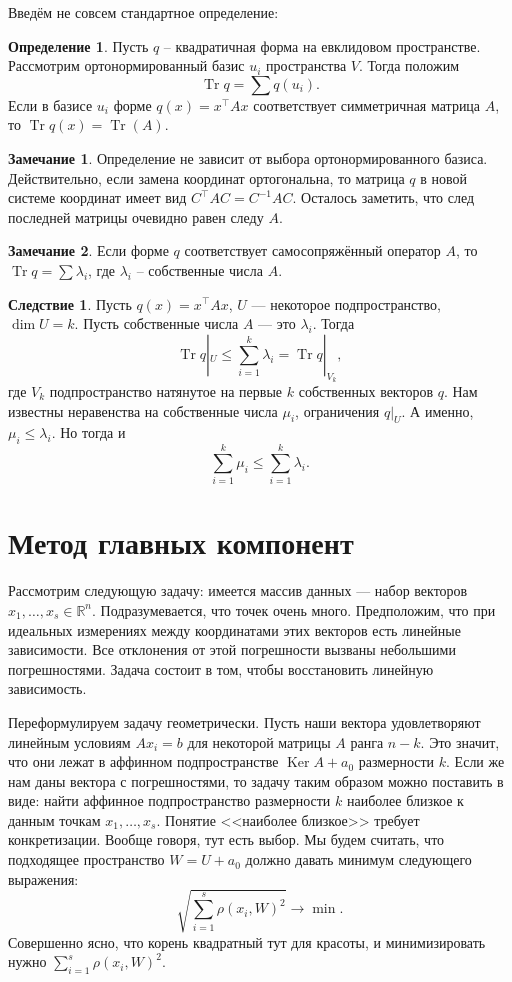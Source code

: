 \documentclass[12pt,a4paper,oneside]{book}
\theoremstyle{definition}
\newtheorem*{rem}{\color{green!50!blue}Замечание}
\newtheorem*{defn}{\color{yellow!30!red} Определение}
\newtheorem{cor}{\color{green!45!black}Следствие}
\renewcommand{\leq}{\leqslant}
\DeclareMathOperator{\Ker}{Ker}
\newcommand{\Tr}{\operatorname{Tr}}
\newcommand{\R}{\mathbb R}
\def\dfn{\begin{defn}}
\def\edfn{\end{defn}}
\def\crl{\begin{cor}}
\def\ecrl{\end{cor}}
\def\rm{\begin{rem}}
\def\erm{\end{rem}}
\begin{document}
Введём не совсем стандартное определение:
\dfn
Пусть $q$ -- квадратичная форма на евклидовом пространстве. Рассмотрим ортонормированный базис $u_i$ пространства $V$. Тогда положим 
$$\Tr q= \sum q(u_i).$$ Если в базисе $u_i$ форме $q(x)=x^{\top} Ax $ соответствует симметричная матрица $A$, то $\Tr q(x)=\Tr(A)$.
\edfn

\rm Определение не зависит от выбора ортонормированного базиса. Действительно, если замена координат ортогональна, то матрица $q$ в новой системе координат имеет вид $C^{\top}AC=C^{-1}AC$. Осталось заметить, что след последней матрицы очевидно равен следу $A$.
\erm

\rm Если форме $q$ соответствует самосопряжённый оператор $A$, то $\Tr q=\sum \lambda_i$, где $\lambda_i$ -- собственные числа $A$.
\erm




\crl Пусть $q(x)=x^{\top} Ax$, $U$ --- некоторое подпространство, $\dim U=k$. Пусть собственные числа $A$ --- это $\lambda_i$. Тогда $$\Tr q|_U\leq \sum_{i=1}^k \lambda_i= \Tr q|_{V_k},$$
где $V_k$ подпространство натянутое на первые $k$ собственных векторов $q$.
\proof Нам известны неравенства на собственные числа $\mu_i$, ограничения $q|_U$. А именно, $\mu_i\leq \lambda_i$. Но тогда и $$\sum_{i=1}^k \mu_i \leq \sum_{i=1}^k \lambda_i.$$
\endproof
\ecrl 






\section{Метод главных компонент}

Рассмотрим следующую задачу: имеется массив данных --- набор векторов $x_1,\dots,x_s \in \R^n$. Подразумевается, что точек очень много. Предположим, что при идеальных измерениях между координатами этих векторов есть линейные зависимости. Все отклонения от этой погрешности вызваны небольшими погрешностями. Задача состоит в том, чтобы восстановить линейную зависимость. 


Переформулируем задачу геометрически. Пусть наши вектора удовлетворяют линейным условиям $Ax_i=b$ для некоторой матрицы $A$ ранга $n-k$. Это значит, что они лежат в аффинном подпространстве $\Ker A + a_0$ размерности $k$. Если же нам даны вектора с погрешностями, то задачу таким образом можно поставить в виде: найти аффинное подпространство размерности $k$ наиболее близкое к данным точкам $x_1,\dots,x_s$. Понятие <<наиболее близкое>> требует конкретизации. Вообще говоря, тут есть выбор. Мы будем считать, что подходящее пространство $W=U+a_0$ должно давать минимум следующего выражения:
$$\sqrt{\sum_{i=1}^s \rho(x_i,W)^2} \to \min.$$
Совершенно ясно, что корень квадратный тут для красоты, и минимизировать нужно $\sum_{i=1}^s \rho(x_i,W)^2$.
\end{document}
